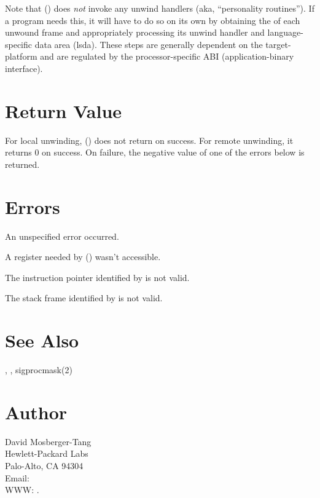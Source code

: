 \documentclass{article}
\begin{document}
Note that () does \emph{not} invoke any unwind
handlers (aka, ``personality routines'').  If a program needs this, it
will have to do so on its own by obtaining the 
of each unwound frame and appropriately processing its unwind handler
and language-specific data area (lsda).  These steps are generally
dependent on the target-platform and are regulated by the
processor-specific ABI (application-binary interface).

\section{Return Value}

For local unwinding, () does not return on success.
For remote unwinding, it returns 0 on success.  On failure, the
negative value of one of the errors below is returned.

\section{Errors}

\begin{Description}
\item[\Const{UNW\_EUNSPEC}] An unspecified error occurred.
\item[\Const{UNW\_EBADREG}] A register needed by () wasn't
  accessible.
\item[\Const{UNW\_EINVALIDIP}] The instruction pointer identified by
   is not valid.
\item[\Const{UNW\_BADFRAME}] The stack frame identified by
   is not valid.
\end{Description}

\section{See Also}

,
,
sigprocmask(2)

\section{Author}

\noindent
David Mosberger-Tang\\
Hewlett-Packard Labs\\
Palo-Alto, CA 94304\\
Email: \\
WWW: .
\LatexManEnd
\end{document}
